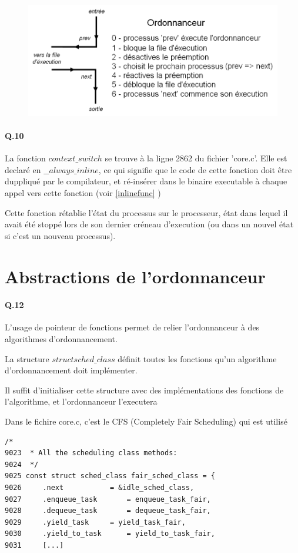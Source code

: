 \documentclass[10pt]{article}
\begin{document}
    \begin{figure}[h!]
        \includegraphics[width=12cm]{q9.png}
    \end{figure}

 \paragraph{Q.10}
 La fonction $context\_switch$ se trouve à la ligne 2862 du fichier 'core.c'.
 Elle est declaré en $\_\_always\_inline$, ce qui signifie que le code de cette fonction doit être duppliqué par le compilateur,
 et ré-insérer dans le binaire executable à chaque appel vers cette fonction (voir \ref{inlinefunc} )
 
 Cette fonction rétablie l'état du processus sur le processeur, état dans lequel il avait été stoppé lors de son dernier créneau d'execution (ou dans un nouvel état si c'est un nouveau processus).

\newpage
\section{Abstractions de l'ordonnanceur}
 \paragraph{Q.12}
 L'usage de pointeur de fonctions permet de relier l'ordonnanceur à des algorithmes d'ordonnancement.
 
 La structure $struct sched\_class$ définit toutes les fonctions qu'un algorithme d'ordonnancement doit implémenter.
 
 Il suffit d'initialiser cette structure avec des implémentations des fonctions de l'algorithme, et l'ordonnanceur l'executera

 Dans le fichire core.c, c'est le CFS (Completely Fair Scheduling) qui est utilisé

\lstset{language=C}
\begin{lstlisting}[frame=single]
      /*
9023  * All the scheduling class methods:
9024  */ 
9025 const struct sched_class fair_sched_class = {
9026     .next           = &idle_sched_class,
9027     .enqueue_task       = enqueue_task_fair,
9028     .dequeue_task       = dequeue_task_fair,
9029     .yield_task     = yield_task_fair,
9030     .yield_to_task      = yield_to_task_fair,
9031     [...] 
\end{lstlisting}
\end{document}
